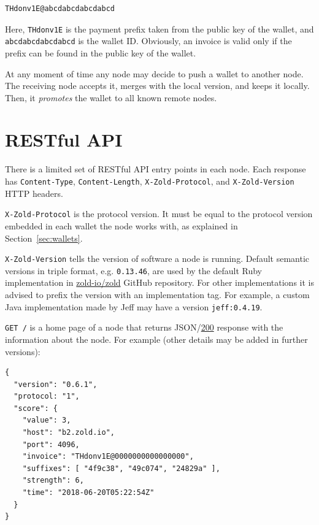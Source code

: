 \documentclass[11pt,oneside]{article}
\newcommand\dd[1]{\colorbox{gray!30}{\texttt{#1}}}
\begin{document}
\begin{verbatim}
THdonv1E@abcdabcdabcdabcd
\end{verbatim}

Here, \dd{THdonv1E} is the payment prefix taken from the public key of
the wallet, and \dd{abcdabcdabcdabcd} is the wallet ID. Obviously, an
invoice is valid only if the prefix can be found in the public key of the wallet.

At any moment of time any node may decide to push a wallet to another node.
The receiving node accepts it, merges with the local version, and keeps it locally.
Then, it \emph{promotes} the wallet to all known remote nodes.

\section{RESTful API}\label{sec:api}

There is a limited set of RESTful API entry points in each node.
Each response has \dd{Content-Type},
\dd{Content-Length}, \dd{X-Zold-Protocol}, and \dd{X-Zold-Version}
HTTP headers.

\dd{X-Zold-Protocol} is the protocol version.
It must be equal to the protocol version embedded in each wallet the
node works with, as explained in Section~\ref{sec:wallets}.

\dd{X-Zold-Version} tells the version of software a node is running.
Default semantic versions in triple format, e.g. \dd{0.13.46}, are used
by the default Ruby implementation in
\href{https://github.com/zold-io/zold}{zold-io/zold} GitHub repository.
For other implementations it is
advised to prefix the version with an implementation tag. For example,
a custom Java implementation made by Jeff may have a version \dd{jeff:0.4.19}.

\dd{GET /} is a home page of a node that returns
JSON/\href{https://www.w3.org/Protocols/rfc2616/rfc2616-sec10.html#sec10.2.1}{200}
response with the
information about the node. For example (other details may be added in
further versions):

\begin{verbatim}
{
  "version": "0.6.1",
  "protocol: "1",
  "score": {
    "value": 3,
    "host": "b2.zold.io",
    "port": 4096,
    "invoice": "THdonv1E@0000000000000000",
    "suffixes": [ "4f9c38", "49c074", "24829a" ],
    "strength": 6,
    "time": "2018-06-20T05:22:54Z"
  }
}
\end{verbatim}
\end{document}

